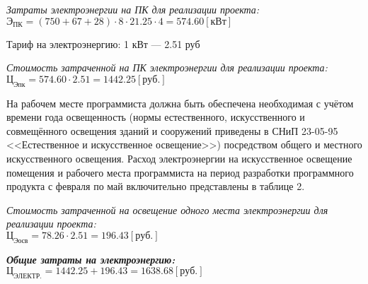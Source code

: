 \textit{Затраты электроэнергии на ПК для реализации проекта:}\\
$Э_{ПК} = (750 + 67 + 28) \cdot 8 \cdot 21.25 \cdot 4 = 574.60 [кВт]$

Тариф на электроэнергию: 1 кВт --- 2.51 руб

\textit{Стоимость затраченной на ПК электроэнергии для реализации проекта:}\\
$Ц_{Эпк} = 574.60 \cdot 2.51 = 1442.25 [руб.]$

На рабочем месте программиста должна быть обеспечена необходимая с учётом времени года освещенность (нормы естественного, искусственного и совмещённого освещения зданий и сооружений приведены в СНиП 23-05-95 <<Естественное и искусственное освещение>>) посредством общего и местного искусственного освещения. Расход электроэнергии на искусственное освещение помещения и рабочего места программиста на период разработки программного продукта с февраля по май включительно представлены в таблице 2.

\textit{Стоимость затраченной на освещение одного места электроэнергии для реализации проекта:}\\
$Ц_{Эосв} = 78.26 \cdot 2.51 = 196.43 [руб.]$

\textbf{\textit{Общие затраты на электроэнергию:}}\\
$Ц_{ЭЛЕКТР.} = 1442.25 + 196.43 = 1638.68 [руб.]$


